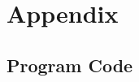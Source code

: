 \section{Appendix}

\listoflistings

\listoffigures

\listoftables

\vfill

\subsection{Program Code}






